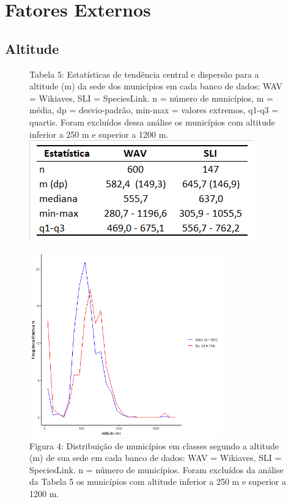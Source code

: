 \section{Fatores Externos}

\subsection {Altitude}

\begin{figure}[h!]
\centering
{\scriptsize Tabela 5: Estatísticas de tendência central e dispersão para a altitude (m) da sede dos municípios em cada banco de dados: WAV = Wikiaves, SLI = SpeciesLink. n = número de municípios, m = média, dp = desvio-padrão, min-max = valores extremos, q1-q3 = quartis. Foram excluídos dessa análise os municípios com altitude inferior a 250 m e superior a 1200 m.}
\includegraphics{Tabelas/5.png}
\end{figure}

\texto

\begin{figure}[h!]
\centering
\includegraphics[height = 8cm]{Imagens/213.png}
\\{\scriptsize Figura 4: Distribuição de municípios em classes segundo a altitude (m) de sua sede em cada banco de dados: WAV = Wikiaves, SLI = SpeciesLink. n = número de municípios. Foram excluídos da análise da Tabela 5 os municípios com altitude inferior a 250 m e superior a 1200 m.}
\end{figure}

